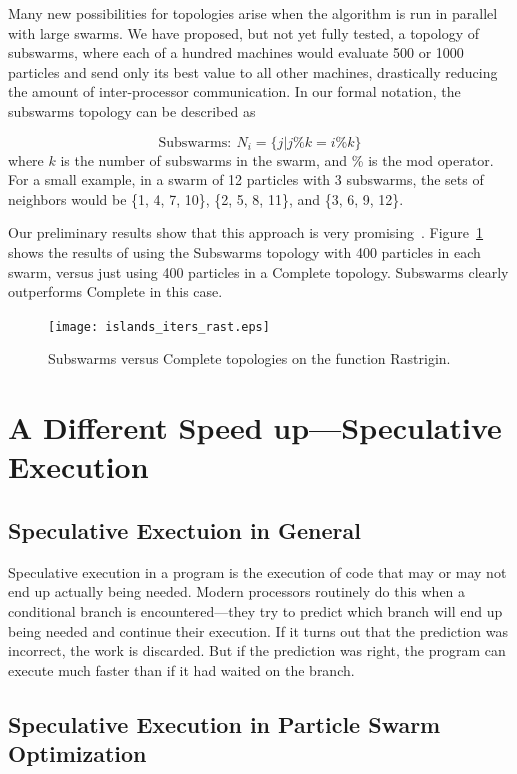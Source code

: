 \documentclass[onecolumn, 12pt]{article}
\begin{document}
Many new possibilities for topologies arise when the algorithm is run in
parallel with large swarms.  We have proposed, but not yet fully tested, a
topology of subswarms, where each of a hundred machines would evaluate 500 or
1000 particles and send only its best value to all other machines, drastically
reducing the amount of inter-processor communication.  In our formal notation,
the subswarms topology can be described as

\[\mathrm{Subswarms:}\ N_i = \{j|j\%k = i\%k\}\]
where $k$ is the number of subswarms in the swarm, and \% is the mod operator.
For a small example, in a swarm of 12 particles with 3 subswarms, the sets of
neighbors would be \{1, 4, 7, 10\}, \{2, 5, 8, 11\}, and \{3, 6, 9, 12\}.

Our preliminary results show that this approach is very
promising~\cite{mcnabb-cec09}.  Figure~\ref{fig:subswarms} shows the results
of using the Subswarms topology with 400 particles in each swarm, versus just
using 400 particles in a Complete topology.  Subswarms clearly outperforms
Complete in this case.

\begin{figure}
  \centering
  \texttt{[image: islands\_iters\_rast.eps]}
  \caption{Subswarms versus Complete topologies on the function Rastrigin.}
  \label{fig:subswarms}
\end{figure}

\section{A Different Speed up---Speculative Execution}
\label{sec:specex}

\subsection{Speculative Exectuion in General}

Speculative execution in a program is the execution of code that may or may not
end up actually being needed.  Modern processors routinely do this when a
conditional branch is encountered---they try to predict which branch will
end up being needed and continue their execution.  If it turns out that the
prediction was incorrect, the work is discarded.  But if the prediction was
right, the program can execute much faster than if it had waited on the branch.  

\subsection{Speculative Execution in Particle Swarm Optimization}
\end{document}
